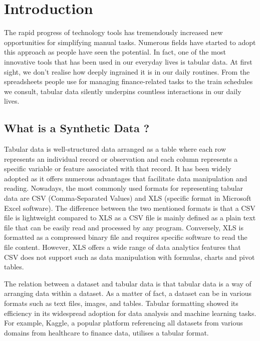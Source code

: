 \chapter{Introduction}



The rapid progress of technology tools has tremendously increased new opportunities for simplifying manual tasks. Numerous fields have started to adopt this approach as people have seen the potential. In fact, one of the most innovative tools that has been used in our everyday lives is tabular data. At first sight, we don't realise how deeply ingrained it is in our daily routines. From the spreadsheets people use for managing finance-related tasks to the train schedules we consult, tabular data silently underpins countless interactions in our daily lives. 

\section{What is a Synthetic Data ?}
\label{sec:DefinitionSyntheticData}

Tabular data is well-structured data arranged as a table where each row represents an individual record or observation and each column represents a specific variable or feature associated with that record. It has been widely adopted as it offers numerous advantages that facilitate data manipulation and reading. Nowadays, the most commonly used formats for representing tabular data are CSV (Comma-Separated Values) and XLS (specific format in Microsoft Excel software). The difference between the two mentioned formats is that a CSV file is lightweight compared to XLS as a CSV file is mainly defined as a plain text file that can be easily read and processed by any program. Conversely, XLS is formatted as a compressed binary file and requires specific software to read the file content. However, XLS offers a wide range of data analytics features that CSV does not support such as data manipulation with formulas, charts and pivot tables.

\vspace{0.5cm}
The relation between a dataset and tabular data is that tabular data is a way of arranging data within a dataset. As a matter of fact, a dataset can be in various formats such as text files, images, and tables. Tabular formatting showed its efficiency in its widespread adoption for data analysis and machine learning tasks. For example, Kaggle, a popular platform referencing all datasets from various domains from healthcare to finance data, utilises a tabular format. 

